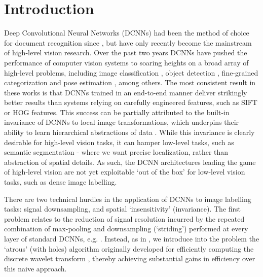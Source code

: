 \section{Introduction}
\label{sec:intro}
Deep Convolutional Neural Networks (DCNNs) had been the method of choice for document recognition since  \citet{LeCun1998}, but 
have only recently become the mainstream of high-level vision research.
Over the past two years  DCNNs have pushed the performance of computer vision systems to soaring heights on a broad array of high-level problems, including image classification \citet{KrizhevskyNIPS2013, papandreou2014untangling, sermanet2013overfeat, simonyan2014very, szegedy2014going}, object detection \citet{girshick2014rcnn}, fine-grained categorization \citet{zhang2014part} and pose estimation \citet{chen2014articulated, tompson2014joint}, among others.
The most consistent result in these works is that DCNNs trained in an end-to-end manner  deliver  strikingly better results than systems relying on carefully engineered features, such as SIFT or HOG features.
This success can be partially attributed to the built-in  invariance of DCNNs to local image transformations, which underpins their ability to learn hierarchical abstractions of data \citep{zeiler2014visualizing}. While this invariance is clearly desirable for high-level vision tasks, it can hamper low-level tasks, such as semantic segmentation - where we want precise localization, rather than abstraction of spatial details.  As such, the DCNN architectures leading the game of high-level vision are not yet exploitable `out of the box' for low-level vision tasks, such as dense image labelling. 



There are two technical hurdles in the application of DCNNs to image labelling
tasks: signal downsampling, and spatial `insensitivity' (invariance).  The
first problem relates to the reduction of signal resolution incurred by the
repeated combination of max-pooling and downsampling (`striding') performed at
every layer of standard DCNNs, e.g. \citep{KrizhevskyNIPS2013,
  simonyan2014very, szegedy2014going}. Instead, as in
\cite{papandreou2014untangling}, we introduce into the problem the `atrous'
(with holes) algorithm originally developed for efficiently computing the
discrete wavelet transform \cite{Mall99}, thereby achieving substantial gains
in efficiency over this naive approach.

